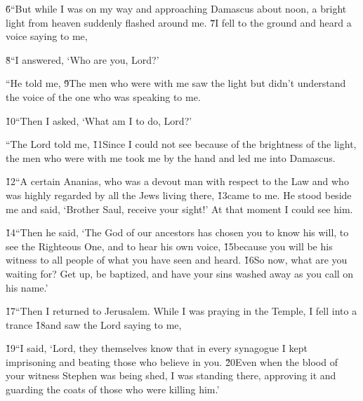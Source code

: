\v{6}``But while I was on my way and approaching Damascus about noon, a bright light from heaven suddenly flashed around me. \v{7}I fell to the ground and heard a voice saying to me, 

\v{8}``I answered, `Who are you, Lord?'

``He told me,  \v{9}The men who were with me saw the light but didn't understand the voice of the one who was speaking to me.

\v{10}``Then I asked, `What am I to do, Lord?'

``The Lord told me,  \v{11}Since I could not see because of the brightness of the light, the men who were with me took me by the hand and led me into Damascus.

\v{12}``A certain Ananias, who was a devout man with respect to the Law and who was highly regarded by all the Jews living there, \v{13}came to me. He stood beside me and said, `Brother Saul, receive your sight!' At that moment I could see him.

\v{14}``Then he said, `The God of our ancestors has chosen you to know his will, to see the Righteous One, and to hear his own voice, \v{15}because you will be his witness to all people of what you have seen and heard. \v{16}So now, what are you waiting for? Get up, be baptized, and have your sins washed away as you call on his name.'

\v{17}``Then I returned to Jerusalem. While I was praying in the Temple, I fell into a trance \v{18}and saw the Lord saying to me, 

\v{19}``I said, `Lord, they themselves know that in every synagogue I kept imprisoning and beating those who believe in you. \v{20}Even when the blood of your witness Stephen was being shed, I was standing there, approving it and guarding the coats of those who were killing him.'


